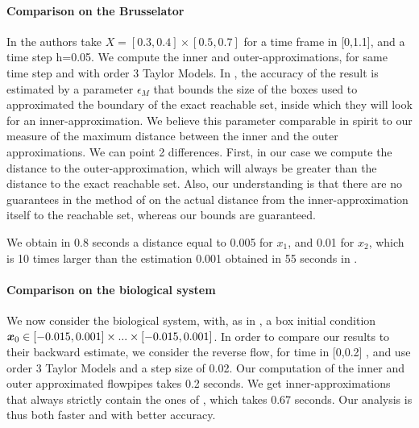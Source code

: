 \documentclass{sig-alternate-05-2015}
\begin{document}
\paragraph{Comparison on the Brusselator}
In \cite{underapprox16} the authors take $X=[0.3, 0.4] \times [0.5, 0.7]$ for a time frame in [0,1.1], and a time step h=0.05. 
We compute the inner and outer-approximations, for same time step and with order 3 Taylor Models.
In \cite{underapprox16}, the accuracy of the result is estimated by a parameter $\epsilon_M$ that bounds the size of 
the boxes used to approximated the boundary of the exact reachable set, inside which they will look for an inner-approximation. 
We believe this parameter comparable in spirit 
to our measure of the maximum distance between the inner and the outer approximations. We can point 2 differences. First, in our case 
we compute the distance to the outer-approximation, which will always be greater than the distance to the exact reachable set.
Also, our understanding is that there are no guarantees in the method of \cite{underapprox16} on the actual distance from the inner-approximation itself 
to the reachable set, whereas our bounds are guaranteed. 

We obtain in 0.8 seconds a distance equal to 0.005 for $x_1$, and 0.01 for $x_2$, which is 10 times larger than the estimation 0.001 obtained 
in 55 seconds in \cite{underapprox16}. 



\paragraph{Comparison on the biological system}
We now consider the biological system, with, as in \cite{underapprox16}, a box initial condition $\x_0 \in [-0.015,0.001] \times...\times [-0.015,0.001]$. 
In order to compare our results to their backward estimate, we consider the reverse flow, 
for time in [0,0.2] , and use order 3 Taylor Models and a step size of 0.02. Our computation of the inner and outer approximated flowpipes takes 0.2 seconds. 
We get inner-approximations that always strictly contain the  ones of \cite{underapprox16}, which takes 0.67 seconds. Our analysis is thus both 
faster and with better accuracy. 
\end{document}
